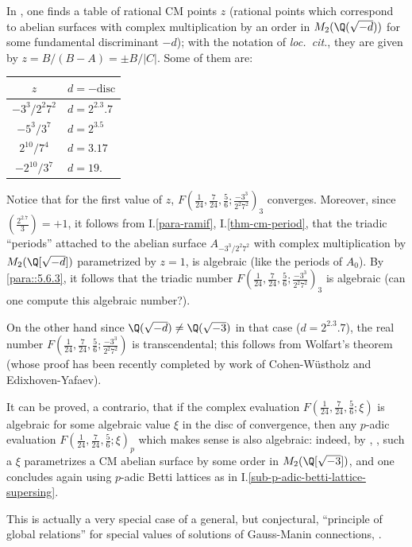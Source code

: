 \begin{para}\label{para::6.6.3} In \cite[Table 2]{elkies98:_shimur}, one finds a
 table of rational CM points $z$ (rational points which correspond to
 abelian surfaces with complex multiplication by an order in
 $M_2(\Q(\sqrt{-d}))$ for some fundamental discriminant $-d$); with the
 notation of {\it loc.~cit.}, they are given by $z=B/(B-A)= \pm B /|
 C|$. Some of them are: 

\vspace{5mm}
\begin{center}
 \renewcommand{\arraystretch}{1.2}
 \begin{tabular}{c @{\quad\qquad}l}
 $ z            $ & $ d=-\mathrm{disc}   $ \\ \hline 
 $ -3^3/2^2 7^2 $ & $ d=2^2.3.7$ \\
 $ -5^3/3^7     $ & $ d=2^3.5  $ \\
 $ 2^{10}/7^4   $ & $ d=3.17   $ \\
 $ -2^{10}/3^7  $ & $ d=19.    $ 
 \end{tabular} 
\end{center}
\vspace{3mm}

 Notice that for the first value of $z$, $F(\frac{1}{24},
 \frac{7}{24},\frac{5}{6}; \frac{-3^3}{2^2 7^2})_3$ converges. Moreover,
 since $(\frac{2^2.7}{3})=+1$, it follows from I.\ref{para-ramif},
 I.\ref{thm-cm-period}, that 
 the triadic ``periods'' attached to the abelian surface $A_{-3^3/ 2^2 7^2}$ 
 with complex multiplication by $M_2(\Q[\sqrt{-d}])$
 parametrized by $z=1$, is algebraic (like the periods of $A_0$). By 
 \ref{para::5.6.3}, it follows that the triadic number
 $F(\frac{1}{24}, \frac{7}{24},\frac{5}{6}; \frac{-3^3}{2^2 7^2})_3 $ is
 algebraic (can one compute this algebraic number?). 
 
 \medskip 
 On the other hand since
 $\Q(\sqrt{-d})\neq \Q(\sqrt{-3})$ in that case ($d=2^2.3.7 $), the real
 number $F(\frac{1}{24}, \frac{7}{24},\frac{5}{6}; \frac{-3^3}{2^2 7^2})$
 is transcendental; this follows from Wolfart's theorem 
 \cite{wolfart88:_werteh_funkt}
 (whose proof has been recently completed by work of Cohen-W\"ustholz
 \cite{cohen01:_number_theor} and Edixhoven-Yafaev).

 \medskip It can be proved, a contrario, that if the complex evaluation
 $F(\frac{1}{24}, \frac{7}{24},\frac{5}{6}; \xi)$ is algebraic for some
 algebraic value $\xi$ in the disc of convergence, then any $p$-adic
 evaluation $F(\frac{1}{24}, \frac{7}{24},\frac{5}{6}; \xi)_p$ which makes
 sense is also algebraic: indeed, by 
 \cite{wolfart88:_werteh_funkt}, \cite{cohen01:_number_theor}, such a
 $\xi$ parametrizes a CM abelian surface by some order in
 $M_2(\Q[\sqrt{-3}])$, and one concludes again using $p$-adic Betti
 lattices as in I.\ref{sub-p-adic-betti-lattice-supersing}.
 
 This is actually a very special case of a general, 
 but conjectural, ``principle of global relations'' for special values of
 solutions of Gauss-Manin connections, \cf \cite{tdmeigdvpdg}.
\end{para}
